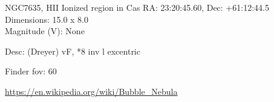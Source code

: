 \begin{block}{NGC7635, HII Ionized region in Cas}
    RA: 23:20:45.60, Dec: +61:12:44.5 \\ 
    Dimensions: 15.0 x 8.0 \\ 
    Magnitude (V): None


    Desc: (Dreyer) vF, *8 inv l excentric 

    Finder fov: 60 

    \url{https://en.wikipedia.org/wiki/Bubble_Nebula} 
\end{block}